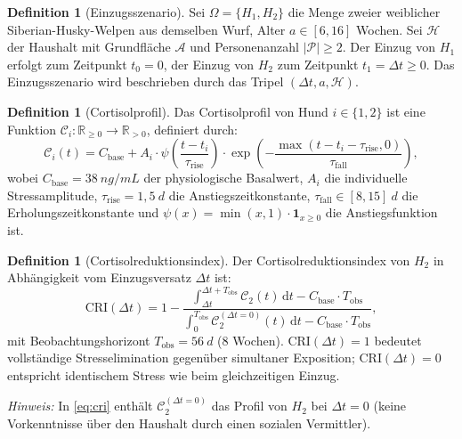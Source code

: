 ﻿\documentclass[12pt, a4paper]{article}
\theoremstyle{plain}
\theoremstyle{definition}
\newtheorem{definition}[theorem]{Definition}
\theoremstyle{remark}
\newcommand{\CRI}{\mathrm{CRI}}
\newcommand{\R}{\mathbb{R}}
\newcommand{\dt}{\Delta t}
\newcommand{\cort}{\mathcal{C}}
\begin{document}
\begin{definition}[Einzugsszenario]\label{def:einzug}
Sei $\Omega = \{H_1, H_2\}$ die Menge zweier weiblicher Siberian-Husky-Welpen
aus demselben Wurf, Alter $a \in [6, 16]$ Wochen. Sei $\mathcal{H}$ der
Haushalt mit Grundfläche $\mathcal{A}$ und Personenanzahl $|\mathcal{P}| \geq 2$.
Der Einzug von $H_1$ erfolgt zum Zeitpunkt $t_0 = 0$, der Einzug von $H_2$ zum
Zeitpunkt $t_1 = \dt \geq 0$. Das Einzugsszenario wird beschrieben durch das
Tripel $(\dt, a, \mathcal{H})$.
\end{definition}

\begin{definition}[Cortisolprofil]\label{def:cortisol}
Das Cortisolprofil von Hund $i \in \{1, 2\}$ ist eine Funktion
$\cort_i : \R_{\geq 0} \to \R_{>0}$, definiert durch:
\begin{equation}
  \cort_i(t) = C_{\mathrm{base}} + A_i \cdot \psi\!\left(\frac{t - t_i}{\tau_{\mathrm{rise}}}\right)
               \cdot \exp\!\left(-\frac{\max(t - t_i - \tau_{\mathrm{rise}}, 0)}{\tau_{\mathrm{fall}}}\right),
  \label{eq:cortisol}
\end{equation}
wobei $C_{\mathrm{base}} = 38\ \si{ng/mL}$ der physiologische Basalwert,
$A_i$ die individuelle Stressamplitude, $\tau_{\mathrm{rise}} = 1{,}5\ \si{d}$
die Anstiegszeitkonstante, $\tau_{\mathrm{fall}} \in [8, 15]\ \si{d}$ die
Erholungszeitkonstante und $\psi(x) = \min(x, 1) \cdot \mathbf{1}_{x \geq 0}$
die Anstiegsfunktion ist.
\end{definition}

\begin{definition}[Cortisolreduktionsindex]\label{def:cri}
Der Cortisolreduktionsindex von $H_2$ in Abhängigkeit vom Einzugsversatz $\dt$
ist:
\begin{equation}
  \CRI(\dt) = 1 - \frac{\int_{\dt}^{\dt+T_{\mathrm{obs}}} \cort_2(t)\,\mathrm{d}t -
              C_{\mathrm{base}} \cdot T_{\mathrm{obs}}}%
              {\int_{0}^{T_{\mathrm{obs}}} \cort_2^{(\dt=0)}(t)\,\mathrm{d}t -
              C_{\mathrm{base}} \cdot T_{\mathrm{obs}}},
  \label{eq:cri}
\end{equation}
mit Beobachtungshorizont $T_{\mathrm{obs}} = 56\ \si{d}$ (8 Wochen).
$\CRI(\dt) = 1$ bedeutet vollständige Stresselimination gegenüber simultaner
Exposition; $\CRI(\dt) = 0$ entspricht identischem Stress wie beim
gleichzeitigen Einzug.
\end{definition}

\noindent\textit{Hinweis:} In \cref{eq:cri} enthält $\cort_2^{(\dt=0)}$ das
Profil von $H_2$ bei $\dt = 0$ (keine Vorkenntnisse über den Haushalt durch
einen sozialen Vermittler).
\end{document}
